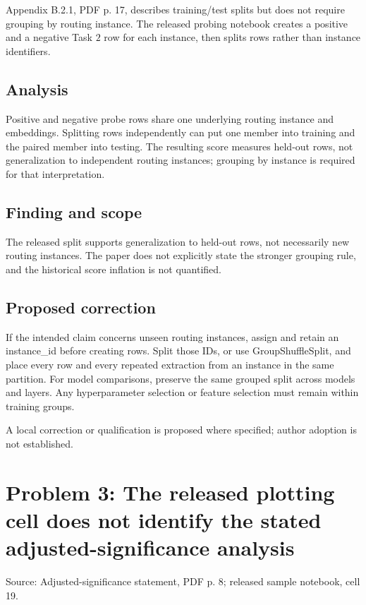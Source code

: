 \documentclass[11pt]{article}
\begin{document}
Appendix B.2.1, PDF p. 17, describes training/test splits but does not require grouping by routing instance. The released probing notebook creates a positive and a negative Task \(2\) row for each instance, then splits rows rather than instance identifiers.

\subsection*{Analysis}

Positive and negative probe rows share one underlying routing instance and embeddings. Splitting rows independently can put one member into training and the paired member into testing. The resulting score measures held-out rows, not generalization to independent routing instances; grouping by instance is required for that interpretation.

\subsection*{Finding and scope}

The released split supports generalization to held-out rows, not necessarily new routing instances. The paper does not explicitly state the stronger grouping rule, and the historical score inflation is not quantified.

\subsection*{Proposed correction}

If the intended claim concerns unseen routing instances, assign and retain an instance\_id before creating rows. Split those IDs, or use GroupShuffleSplit, and place every row and every repeated extraction from an instance in the same partition. For model comparisons, preserve the same grouped split across models and layers. Any hyperparameter selection or feature selection must remain within training groups.

A local correction or qualification is proposed where specified; author adoption is not established.

\section*{Problem 3: The released plotting cell does not identify the stated adjusted-significance analysis}

Source: Adjusted-significance statement, PDF p. 8; released sample notebook, cell 19.
\end{document}
